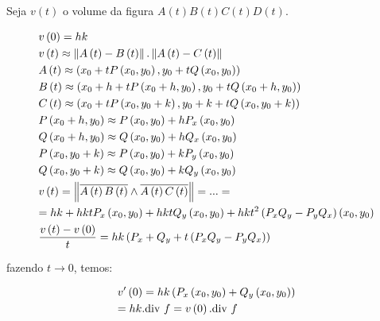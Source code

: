 \documentclass{book}
\begin{document}
\begin{sol}

Seja $v\left( t \right)$ o volume da figura $A(t)B(t)C(t)D(t)$.

\[
\begin{gathered}
  v\left( 0 \right) = hk \hfill \\
  v\left( t \right) \approx \left\| {A\left( t \right) - B\left( t \right)} \right\|.\left\| {A\left( t \right) - C\left( t \right)} \right\| \hfill \\
  A\left( t \right) \approx \left( {x_0  + tP\left( {x_0 ,y_0 } \right),y_0  + tQ\left( {x_0 ,y_0 } \right)} \right) \hfill \\
  B\left( t \right) \approx \left( {x_0  + h + tP\left( {x_0  + h,y_0 } \right),y_0  + tQ\left( {x_0  + h,y_0 } \right)} \right) \hfill \\
  C\left( t \right) \approx \left( {x_0  + tP\left( {x_0 ,y_0  + k} \right),y_0  + k + tQ\left( {x_0 ,y_0  + k} \right)} \right) \hfill \\
  P\left( {x_0  + h,y_0 } \right) \approx P\left( {x_0 ,y_0 } \right) + hP_x \left( {x_0 ,y_0 } \right) \hfill \\
  Q\left( {x_0  + h,y_0 } \right) \approx Q\left( {x_0 ,y_0 } \right) + hQ_x \left( {x_0 ,y_0 } \right) \hfill \\
  P\left( {x_0 ,y_0  + k} \right) \approx P\left( {x_0 ,y_0 } \right) + kP_y \left( {x_0 ,y_0 } \right) \hfill \\
  Q\left( {x_0 ,y_0  + k} \right) \approx Q\left( {x_0 ,y_0 } \right) + kQ_y \left( {x_0 ,y_0 } \right) \hfill \\
  v\left( t \right) = \left\| {\overline {A\left( t \right)B\left( t \right)}  \wedge \overline {A\left( t \right)C\left( t \right)} } \right\| = ... =  \hfill \\
   = hk + hktP_x \left( {x_0 ,y_0 } \right) + hktQ_y \left( {x_0 ,y_0 } \right) + hkt^2 \left( {P_x Q_y  - P_y Q_x } \right)\left( {x_0 ,y_0 } \right) \hfill \\
  \frac{{v\left( t \right) - v\left( 0 \right)}}
{t} = hk\left( {P_x  + Q_y  + t\left( {P_x Q_y  - P_y Q_x } \right)} \right) \hfill \\
\end{gathered}
\]

fazendo $t \to 0$, temos:

\[
\begin{gathered}
  v'\left( 0 \right) = hk\left( {P_x \left( {x_0 ,y_0 } \right) + Q_y \left( {x_0 ,y_0 } \right)} \right) \hfill \\
   = hk.{\text{div }}f = v\left( 0 \right).{\text{div }}f \hfill \\
\end{gathered}
\]

\end{sol}
\end{document}
